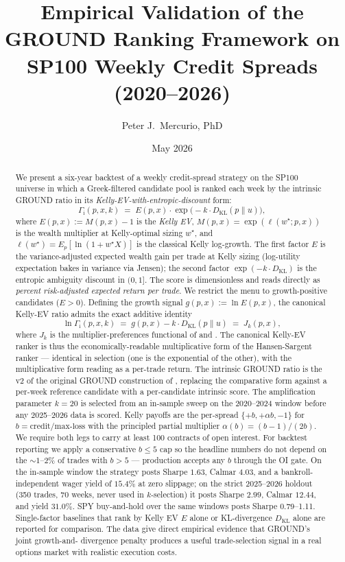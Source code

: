 \documentclass[11pt]{article}
\title{Empirical Validation of the GROUND Ranking Framework on \\
       SP100 Weekly Credit Spreads (2020--2026)}
\author{Peter J.~Mercurio, PhD}
\affil{\small \texttt{peter.mercurio@alumni.utoronto.ca}}
\date{May 2026}
\newcommand{\GROUND}{\Gamma_{\mathrm{i}}}
\begin{document}
\maketitle

\begin{abstract}
We present a six-year backtest of a weekly credit-spread strategy on the
SP100 universe in which a Greek-filtered candidate pool is ranked each week
by the intrinsic GROUND ratio in its \emph{Kelly-EV-with-entropic-discount}
form:
\[
\GROUND(p, x, k) \;=\; E(p, x) \cdot \exp\!\bigl(-k \cdot D_{\mathrm{KL}}(p \| u)\bigr),
\]
where $E(p, x) := M(p, x) - 1$ is the \emph{Kelly EV}, $M(p, x) =
\exp(\ell(w^\star; p, x))$ is the wealth multiplier at Kelly-optimal
sizing $w^\star$, and $\ell(w^\star) = E_p[\ln(1 + w^\star X)]$ is the
classical Kelly log-growth. The first factor $E$ is the
variance-adjusted expected wealth gain per trade at Kelly sizing
(log-utility expectation bakes in variance via Jensen); the second
factor $\exp(-k \cdot D_{\mathrm{KL}})$ is the entropic ambiguity
discount in $(0, 1]$. The score is dimensionless and reads directly as
\emph{percent risk-adjusted expected return per trade}. We restrict the
menu to growth-positive candidates ($E > 0$). Defining the growth
signal $g(p, x) := \ln E(p, x)$, the canonical Kelly-EV ratio admits the
exact additive identity
\[
\ln \GROUND(p, x, k) \;=\; g(p, x) - k \cdot D_{\mathrm{KL}}(p \| u) \;=\; J_k(p, x),
\]
where $J_k$ is the multiplier-preferences functional of
\citet{hansen2008robustness} and \citet{maccheroni2006ambiguity}. The
canonical Kelly-EV ranker is thus the economically-readable
multiplicative form of the Hansen-Sargent ranker --- identical in
selection (one is the exponential of the other), with the
multiplicative form reading as a per-trade return. The intrinsic GROUND ratio is the v2
of the original GROUND construction of \citet{mercurio2020}, replacing
the comparative form against a per-week reference candidate with a
per-candidate intrinsic score. The amplification parameter $k = 20$ is
selected from an in-sample sweep on the 2020--2024 window before any
2025--2026 data is scored. Kelly payoffs are the per-spread $\{+b,
+\alpha b, -1\}$ for $b = \text{credit}/\text{max-loss}$ with the
principled partial multiplier $\alpha(b) = (b-1)/(2b)$. We require both
legs to carry at least 100 contracts of open interest. For backtest
reporting we apply a conservative $b \le 5$ cap so the headline
numbers do not depend on the $\sim 1$--$2\%$ of trades with $b > 5$ ---
production accepts any $b$ through the OI gate. On the in-sample window the
strategy posts Sharpe $1.63$, Calmar $4.03$, and a bankroll-independent
wager yield of $15.4\%$ at zero slippage; on the strict 2025--2026
holdout (350 trades, 70 weeks, never used in $k$-selection) it posts
Sharpe $2.99$, Calmar $12.44$, and yield $31.0\%$. SPY buy-and-hold over the same windows posts Sharpe
0.79--1.11. Single-factor baselines that rank by Kelly EV $E$ alone
or KL-divergence $D_{\mathrm{KL}}$ alone are reported for comparison.
The data give direct empirical evidence that GROUND's joint growth-and-
divergence penalty produces a useful trade-selection signal in a real
options market with realistic execution costs.
\end{abstract}
\end{document}
